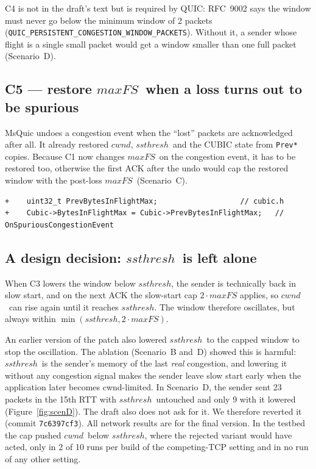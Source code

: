 \documentclass[11pt,a4paper]{article}
\newcommand{\maxfs}{\ensuremath{\mathit{maxFS}}}
\newcommand{\cwnd}{\ensuremath{\mathit{cwnd}}}
\newcommand{\ssthresh}{\ensuremath{\mathit{ssthresh}}}
\begin{document}
C4 is not in the draft's text but is required by QUIC: RFC~9002 says the
window must never go below the minimum window of 2 packets
(\texttt{QUIC\_PERSISTENT\_CONGESTION\_WINDOW\_PACKETS}). Without it, a sender
whose flight is a single small packet would get a window smaller than one
full packet (Scenario~D).

\subsection*{C5 --- restore \maxfs\ when a loss turns out to be spurious}

MsQuic undoes a congestion event when the ``lost'' packets are acknowledged
after all. It already restored \cwnd, \ssthresh\ and the CUBIC state from
\texttt{Prev*} copies. Because C1 now changes \maxfs\ on the congestion event,
it has to be restored too, otherwise the first ACK after the undo would cap
the restored window with the post-loss \maxfs\ (Scenario~C).

\begin{lstlisting}[style=diff]
+    uint32_t PrevBytesInFlightMax;                   // cubic.h
+    Cubic->BytesInFlightMax = Cubic->PrevBytesInFlightMax;   // OnSpuriousCongestionEvent
\end{lstlisting}

\subsection{A design decision: \ssthresh\ is left alone}
\label{sec:design}

When C3 lowers the window below \ssthresh, the sender is technically back
in slow start, and on the next ACK the slow-start cap $2\cdot\maxfs$ applies,
so \cwnd\ can rise again until it reaches \ssthresh. The window therefore
oscillates, but always within $\min(\ssthresh, 2\cdot\maxfs)$.

An earlier version of the patch also lowered \ssthresh\ to the capped
window to stop the oscillation. The ablation (Scenario~B and~D) showed this
is harmful: \ssthresh\ is the sender's memory of the last \emph{real}
congestion, and lowering it without any congestion signal makes the sender
leave slow start early when the application later becomes cwnd-limited.
In Scenario~D, the sender sent 23 packets in the 15th RTT with \ssthresh\
untouched and only 9 with it lowered (Figure~\ref{fig:scenD}). The draft
also does not ask for it. We therefore reverted it (commit
\texttt{7c6397cf3}). All network results are for the final version. In the
testbed the cap pushed \cwnd\ below \ssthresh, where the rejected variant would
have acted, only in 2 of 10 runs per build of the competing-TCP setting and in
no run of any other setting.
\end{document}
